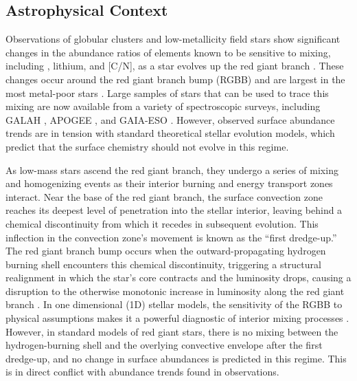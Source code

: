 %
%
%
\subsection{Astrophysical Context}
Observations of globular clusters and low-metallicity field stars show significant changes in the abundance ratios of elements known to be sensitive to mixing, including \ctwelvecthirteen, lithium, and [C/N], as a star evolves up the red giant branch \citep{Carbon1982, Pilachowski1986, Kraft1994, Shetrone2019}. These changes occur around the red giant branch bump (RGBB) and are largest in the most metal-poor stars \citep[e.g.][]{Gratton2000}. Large samples of stars that can be used to trace this mixing are now available from a variety of spectroscopic surveys, including GALAH \citep{buder2019}, APOGEE \citep{DR17}, and GAIA-ESO \citep{Magrini2021b}. However, observed surface abundance trends are in tension with standard theoretical stellar evolution models, which predict that the surface chemistry should not evolve in this regime.

As low-mass stars ascend the red giant branch, they undergo a series of mixing and homogenizing events as their interior burning and energy transport zones interact. Near the base of the red giant branch, the surface convection zone reaches its deepest level of penetration into the stellar interior, leaving behind a chemical discontinuity from which it recedes in subsequent evolution. This inflection in the convection zone's movement is known as the ``first dredge-up.'' The red giant branch bump occurs when the outward-propagating hydrogen burning shell encounters this chemical discontinuity, triggering a structural realignment in which the star's core contracts and the luminosity drops, causing a disruption to the otherwise monotonic increase in luminosity along the red giant branch \citep{Christensen-Dalsgaard:2015}. In one dimensional (1D) stellar models, the sensitivity of the RGBB to physical assumptions makes it a powerful diagnostic of interior mixing processes \textbf{\citep[e.g.][]{FusiPecci1990,Salaris2002, Joyce2015, Khan2018}}. 
%
However, in standard models of red giant stars, there is no mixing between the hydrogen-burning shell and the overlying convective envelope after the first dredge-up, and no change in surface abundances is predicted in this regime. This is in direct conflict with abundance trends found in observations.


